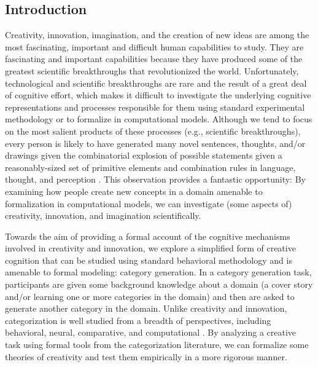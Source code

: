 \documentclass[12pt]{article}
\begin{document}
\begin{flushleft}

\section{Introduction}
\setlength\parindent{0.5in}

Creativity, innovation, imagination, and the creation of new ideas are among the most fascinating, important and difficult human capabilities to study. They are fascinating and important capabilities because they have produced some of the greatest scientific breakthroughs that revolutionized the world. Unfortunately, technological and scientific breakthroughs are rare and the result of a great deal of cognitive effort, which makes it difficult to investigate the underlying cognitive representations and processes responsible for them using standard experimental methodology or to formalize in computational models. Although we tend to focus on the most salient products of these processes (e.g., scientific breakthroughs), every person is likely to have generated many novel sentences, thoughts, and/or drawings given the combinatorial explosion of possible statements given a reasonably-sized set of primitive elements and combination rules in language, thought, and perception \citep{goldstone2003}. This observation provides a fantastic opportunity: By examining how people create new concepts in a domain amenable to formalization in computational models, we can investigate (some aspects of) creativity, innovation, and imagination scientifically.

Towards the aim of providing a formal account of the cognitive mechanisms involved in creativity and innovation, we explore a simplified form of creative cognition that can be studied using standard behavioral methodology and is amenable to formal modeling: category generation. In a category generation task, participants are given some background knowledge about a domain (a cover story and/or learning one or more categories in the domain) and then are asked to generate another category in the domain. Unlike creativity and innovation, categorization is well studied from a breadth of perspectives, including behavioral, neural, comparative, and computational  \citep{kurtz2015human,mack2013,margolis2015,pothoswills2011}. By analyzing a creative task using formal tools from the categorization literature, we can formalize some theories of creativity and test them empirically in a more rigorous manner. 


\end{flushleft}
\end{document}
